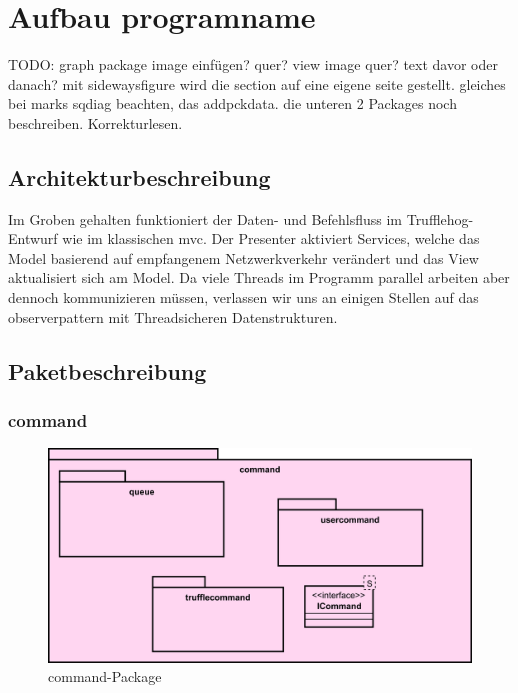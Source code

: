 \chapter{Aufbau \gls{programname}}
\label{ch:aufbau_programname}
                                        TODO:
                                        graph package image einfügen? quer? view image quer? text davor oder danach? mit sidewaysfigure wird die section auf eine eigene seite gestellt.
                                        gleiches bei marks sqdiag beachten, das addpckdata.
                                        die unteren 2 Packages noch beschreiben.
                                        Korrekturlesen.
\section{Architekturbeschreibung}
Im Groben gehalten funktioniert der Daten- und Befehlsfluss im Trufflehog-Entwurf
wie im klassischen \gls{mvc}. Der Presenter aktiviert Services, welche das Model basierend
auf empfangenem Netzwerkverkehr verändert und das View aktualisiert sich am Model.
Da viele Threads im Programm parallel arbeiten aber dennoch kommunizieren müssen,
verlassen wir uns an einigen Stellen auf das \gls{observerpattern} mit
Threadsicheren Datenstrukturen.\newline
\newline

\section{Paketbeschreibung}

\subsection{command}
\label{subsec:command}

\begin{figure}[H]
  \centering
  \includegraphics[width=\textwidth]{../diagramimages/command.png}
  \caption{command-Package}
\end{figure}

